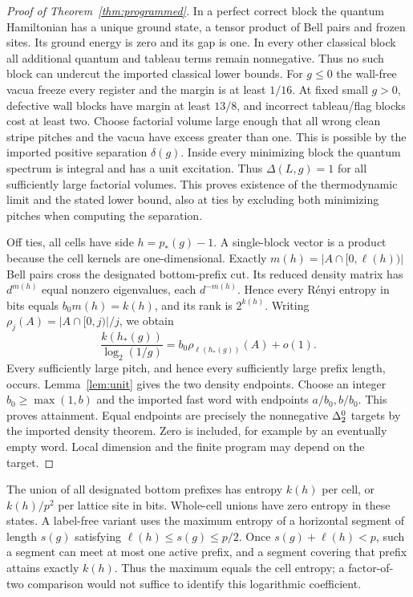 \begin{proof}[Proof of Theorem~\ref{thm:programmed}]
In a perfect correct block the quantum Hamiltonian has a unique
ground state, a tensor product of Bell pairs and frozen sites.
Its ground energy is zero and its gap is one. In every other classical
block all additional quantum and tableau terms remain nonnegative.
Thus no such block can undercut the imported classical lower bounds.
For $g\leq0$ the wall-free vacua freeze every register and the margin
is at least $1/16$. At fixed small $g>0$, defective wall blocks have
margin at least $13/8$, and incorrect tableau/flag blocks cost at
least two. Choose factorial volume large enough that all wrong clean
stripe pitches and the vacua have excess greater than one. This is
possible by the imported positive separation $\delta(g)$. Inside
every minimizing block the quantum spectrum is integral and has a
unit excitation. Thus $\Delta(L,g)=1$ for all sufficiently large
factorial volumes. This proves existence of the thermodynamic limit
and the stated lower bound, also at ties by excluding both minimizing
pitches when computing the separation.

Off ties, all cells have side $h=p_*(g)-1$. A single-block vector
is a product because the cell kernels are one-dimensional.
Exactly $m(h)=|A\cap[0,\ell(h))|$ Bell pairs cross the designated
bottom-prefix cut. Its reduced density matrix has $d^{m(h)}$ equal
nonzero eigenvalues, each $d^{-m(h)}$. Hence every R\'enyi entropy
in bits equals $b_0m(h)=k(h)$, and its rank is $2^{k(h)}$.
Writing $\rho_j(A)=|A\cap[0,j)|/j$, we obtain
\begin{equation}\label{eq:density}
 \frac{k(h_*(g))}{\log_2(1/g)}
       =b_0\rho_{\ell(h_*(g))}(A)+o(1).
\end{equation}
Every sufficiently large pitch, and hence every sufficiently large
prefix length, occurs. Lemma~\ref{lem:unit} gives the two density
endpoints. Choose an integer $b_0\geq\max(1,b)$ and the imported fast
word with endpoints $a/b_0,b/b_0$. This proves attainment. Equal
endpoints are precisely the nonnegative $\Delta^0_2$ targets by the imported
density theorem. Zero is included, for example by an eventually empty
word. Local dimension and the finite program may depend on the target.
\end{proof}

The union of all designated bottom prefixes has entropy $k(h)$ per
cell, or $k(h)/p^2$ per lattice site in bits. Whole-cell unions have
zero entropy in these states. A label-free variant uses the maximum
entropy of a horizontal segment of length $s(g)$ satisfying
$\ell(h)\leq s(g)\leq p/2$. Once $s(g)+\ell(h)<p$, such a segment
can meet at most one active prefix, and a segment covering that prefix
attains exactly $k(h)$. Thus the maximum equals the cell entropy;
a factor-of-two comparison would not suffice to identify this
logarithmic coefficient.

